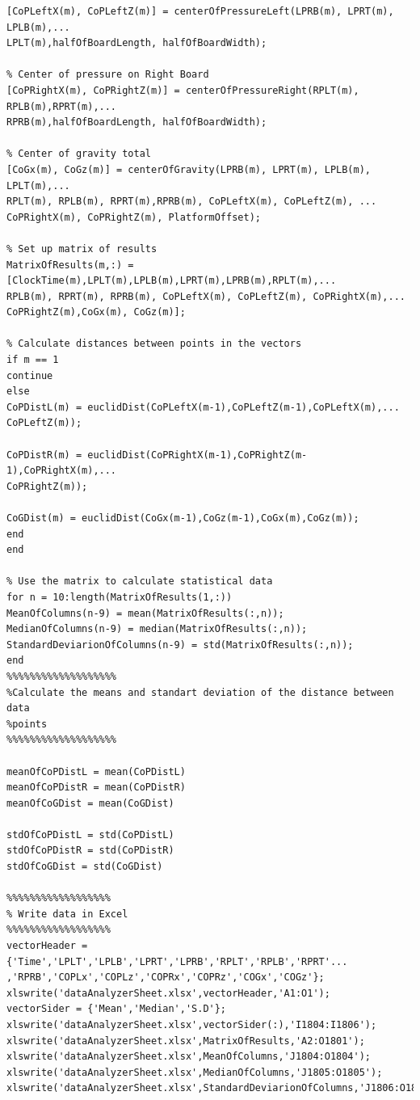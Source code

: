 \documentclass[twoside]{ctuthesis}
\theoremstyle{plain}
\theoremstyle{definition}
\theoremstyle{note}
\begin{document}
\begin{lstlisting}[style=Matlab-editor]
% Center of pressure Left Board
[CoPLeftX(m), CoPLeftZ(m)] = centerOfPressureLeft(LPRB(m), LPRT(m), LPLB(m),...
LPLT(m),halfOfBoardLength, halfOfBoardWidth);

% Center of pressure on Right Board
[CoPRightX(m), CoPRightZ(m)] = centerOfPressureRight(RPLT(m), RPLB(m),RPRT(m),...
RPRB(m),halfOfBoardLength, halfOfBoardWidth);

% Center of gravity total
[CoGx(m), CoGz(m)] = centerOfGravity(LPRB(m), LPRT(m), LPLB(m), LPLT(m),...
RPLT(m), RPLB(m), RPRT(m),RPRB(m), CoPLeftX(m), CoPLeftZ(m), ...
CoPRightX(m), CoPRightZ(m), PlatformOffset);

% Set up matrix of results
MatrixOfResults(m,:) = [ClockTime(m),LPLT(m),LPLB(m),LPRT(m),LPRB(m),RPLT(m),...
RPLB(m), RPRT(m), RPRB(m), CoPLeftX(m), CoPLeftZ(m), CoPRightX(m),...
CoPRightZ(m),CoGx(m), CoGz(m)];

% Calculate distances between points in the vectors
if m == 1
continue
else
CoPDistL(m) = euclidDist(CoPLeftX(m-1),CoPLeftZ(m-1),CoPLeftX(m),...
CoPLeftZ(m));

CoPDistR(m) = euclidDist(CoPRightX(m-1),CoPRightZ(m-1),CoPRightX(m),...
CoPRightZ(m));

CoGDist(m) = euclidDist(CoGx(m-1),CoGz(m-1),CoGx(m),CoGz(m));
end
end

% Use the matrix to calculate statistical data
for n = 10:length(MatrixOfResults(1,:))
MeanOfColumns(n-9) = mean(MatrixOfResults(:,n));
MedianOfColumns(n-9) = median(MatrixOfResults(:,n));
StandardDeviarionOfColumns(n-9) = std(MatrixOfResults(:,n));
end 
%%%%%%%%%%%%%%%%%%%
%Calculate the means and standart deviation of the distance between data
%points
%%%%%%%%%%%%%%%%%%%

meanOfCoPDistL = mean(CoPDistL)
meanOfCoPDistR = mean(CoPDistR)
meanOfCoGDist = mean(CoGDist)

stdOfCoPDistL = std(CoPDistL)
stdOfCoPDistR = std(CoPDistR)
stdOfCoGDist = std(CoGDist)

%%%%%%%%%%%%%%%%%%
% Write data in Excel
%%%%%%%%%%%%%%%%%%
vectorHeader = {'Time','LPLT','LPLB','LPRT','LPRB','RPLT','RPLB','RPRT'...
,'RPRB','COPLx','COPLz','COPRx','COPRz','COGx','COGz'};
xlswrite('dataAnalyzerSheet.xlsx',vectorHeader,'A1:O1');
vectorSider = {'Mean','Median','S.D'};
xlswrite('dataAnalyzerSheet.xlsx',vectorSider(:),'I1804:I1806');
xlswrite('dataAnalyzerSheet.xlsx',MatrixOfResults,'A2:O1801');
xlswrite('dataAnalyzerSheet.xlsx',MeanOfColumns,'J1804:O1804');
xlswrite('dataAnalyzerSheet.xlsx',MedianOfColumns,'J1805:O1805');
xlswrite('dataAnalyzerSheet.xlsx',StandardDeviarionOfColumns,'J1806:O1806');


\end{lstlisting}
\end{document}
